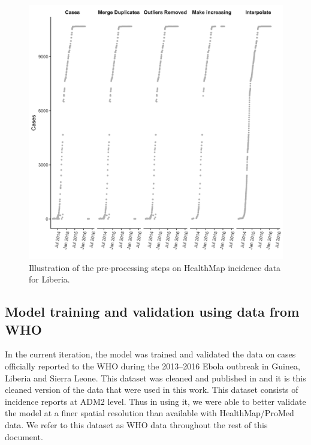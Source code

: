 \documentclass[11pt,]{article}
\begin{document}
\begin{figure}
  \centering
  \includegraphics{ms6-figures/liberia-preprocessing}
  \caption{Illustration of the pre-processing steps on HealthMap incidence
    data for Liberia.}
  \label{fig:wf_example}
\end{figure}

\subsection{Model training and validation using data from
WHO}\label{model-training-and-validation-using-data-from-who}

In the current iteration, the model was trained and validated the data
on cases officially reported to the WHO during the 2013--2016 Ebola
outbreak in Guinea, Liberia and Sierra Leone. This dataset was cleaned
and published in \citep{garske20160308} and it is this cleaned version
of the data that were used in this work. This dataset consists of
incidence reports at ADM2 level. Thus in using it, we were able to
better validate the model at a finer spatial resolution than available
with HealthMap/ProMed data. We refer to this dataset as WHO data
throughout the rest of this document.
\end{document}
